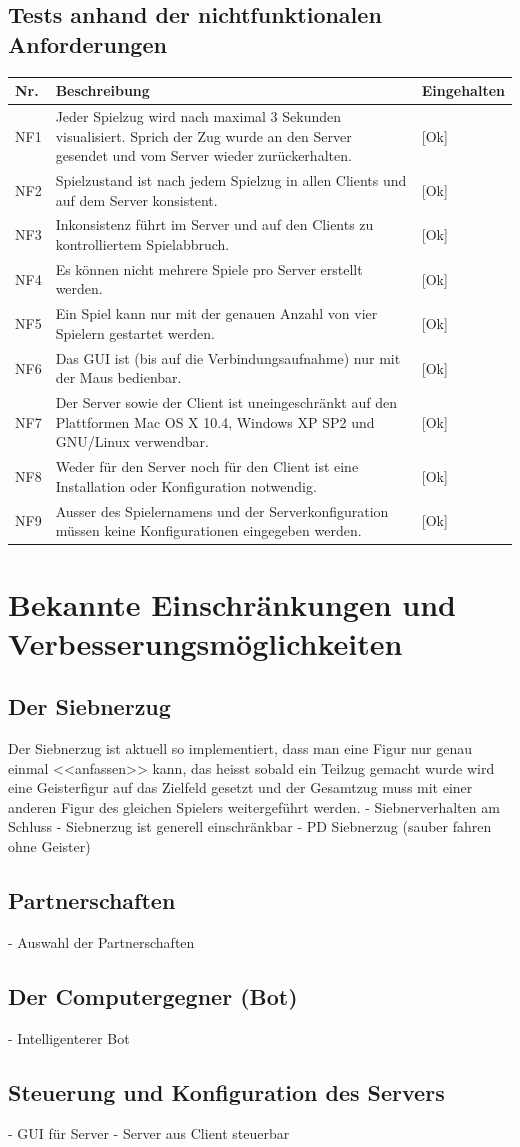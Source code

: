 \documentclass[12pt,halfparskip]{scrartcl}
\begin{document}
\subsection{Tests anhand der nichtfunktionalen Anforderungen}
	\begin {tabular}{l p{11cm} l}
		\toprule
		\textbf{Nr.} & \textbf{Beschreibung} & \textbf{Eingehalten} \\
		\midrule
		NF1 & Jeder Spielzug wird nach maximal 3 Sekunden visualisiert. Sprich der Zug wurde an den Server gesendet und vom Server wieder zurückerhalten. & [Ok] \\
		NF2 & Spielzustand ist nach jedem Spielzug in allen Clients und auf dem Server konsistent. & [Ok] \\
		NF3 & Inkonsistenz führt im Server und auf den Clients zu kontrolliertem Spielabbruch. & [Ok] \\
		NF4 & Es können nicht mehrere Spiele pro Server erstellt werden. & [Ok] \\
		NF5 & Ein Spiel kann nur mit der genauen Anzahl von vier Spielern gestartet werden. & [Ok] \\
		NF6 & Das GUI ist (bis auf die Verbindungsaufnahme) nur mit der Maus bedienbar. & [Ok] \\
		NF7 & Der Server sowie der Client ist uneingeschränkt auf den Plattformen Mac OS X 10.4, Windows XP SP2 und GNU/Linux verwendbar. & [Ok] \\
		NF8 & Weder für den Server noch für den Client ist eine Installation oder Konfiguration notwendig. & [Ok] \\
		NF9 & Ausser des Spielernamens und der Serverkonfiguration müssen keine Konfigurationen eingegeben werden. & [Ok] \\
		\bottomrule
	\end{tabular}
	
\section{Bekannte Einschränkungen und Verbesserungsmöglichkeiten}
\subsection{Der Siebnerzug}
Der Siebnerzug ist aktuell so implementiert, dass man eine Figur nur genau einmal <<anfassen>> kann, das heisst sobald ein Teilzug gemacht wurde wird eine Geisterfigur auf das Zielfeld gesetzt und der Gesamtzug muss mit einer anderen Figur des gleichen Spielers weitergeführt werden.
- Siebnerverhalten am Schluss 
- Siebnerzug ist generell einschränkbar
- PD Siebnerzug (sauber fahren ohne Geister)

\subsection{Partnerschaften}
- Auswahl der Partnerschaften

\subsection{Der Computergegner (Bot)}
- Intelligenterer Bot

\subsection{Steuerung und Konfiguration des Servers}
- GUI für Server
- Server aus Client steuerbar
\end{document}
